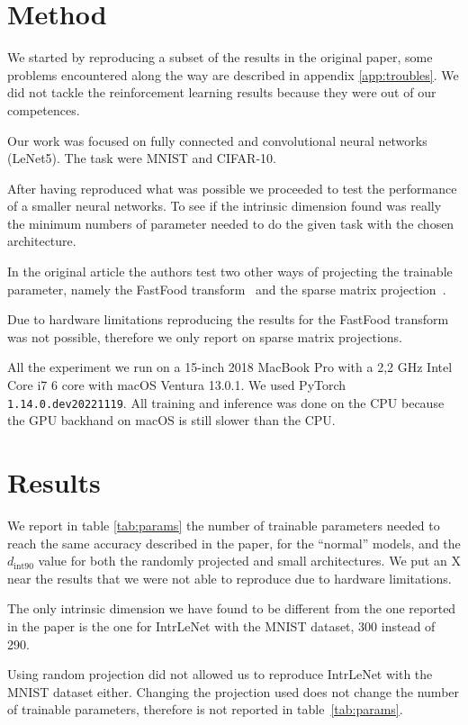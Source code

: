 \documentclass[twocolumn]{article}
\begin{document}
\section{Method}
We started by reproducing a subset of the results in the original paper, some
problems encountered along the way are described in appendix \ref{app:troubles}.
We did not tackle the reinforcement learning results because they were out of
our competences.

Our work was focused on fully connected and convolutional neural networks
(LeNet5). The task were MNIST and CIFAR-10.

After having reproduced what was possible we proceeded to test the performance
of a smaller neural networks. To see if the intrinsic dimension found was really
the minimum numbers of parameter needed to do the given task with the chosen
architecture.

In the original article the authors test two other ways of projecting the
trainable parameter, namely the FastFood transform~\cite{fastfood} and the
sparse matrix projection~\cite{sparse}.

Due to hardware limitations reproducing the results for the FastFood transform
was not possible, therefore we only report on sparse matrix projections.

All the experiment we run on a 15-inch 2018 MacBook Pro with a 2,2 GHz Intel
Core i7 6 core with macOS Ventura 13.0.1. We used PyTorch \texttt{1.14.0.dev20221119}. All training and inference was done on the CPU because the
GPU backhand on macOS is still slower than the CPU.

\section{Results}
We report in table \ref{tab:params} the number of trainable parameters needed to
reach the same accuracy described in the paper, for the ``normal'' models, and
the $d_{\mathrm{int}90}$ value for both the randomly projected and small
architectures. We put an X near the results that we were not able to reproduce
due to hardware limitations.

The only intrinsic dimension we have found to be different from the one reported
in the paper is the one for IntrLeNet with the MNIST dataset, 300 instead of
290.

Using random projection did not allowed us to reproduce IntrLeNet with the MNIST
dataset either. Changing the projection used does not change the number of
trainable parameters, therefore is not reported in table~\ref{tab:params}.
\end{document}

